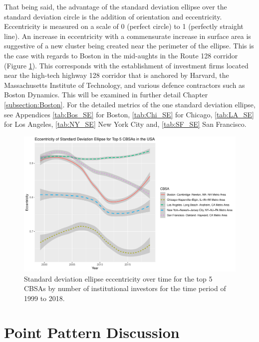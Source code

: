 That being said, the advantage of the standard deviation ellipse over the standard deviation circle is the addition of orientation and eccentricity. Eccentricity is measured on a scale of 0 (perfect circle) to 1 (perfectly straight line).  An increase in eccentricity with a commensurate increase in surface area is suggestive of a new cluster being created near the perimeter of the ellipse. This is the case with regards to Boston in the mid-aughts in the Route 128 corridor (Figure \ref{fig:Standard_Deviation_ellipse_Eccentricity}). This corresponds with the establishment of investment firms located near the high-tech highway 128 corridor that is anchored by Harvard, the Massachusetts Institute of Technology, and various defence contractors such as Boston Dynamics.  This will be examined in further detail Chapter \ref{subsection:Boston}.  For the detailed metrics of the one standard deviation ellipse, see Appendices \ref{tab:Bos_SE} for Boston, \ref{tab:Chi_SE} for Chicago, \ref{tab:LA_SE} for Los Angeles, \ref{tab:NY_SE} New York City and, \ref{tab:SF_SE} San Francisco. 


\begin{figure}[h]
	\centering
	\includegraphics[width=1\linewidth]{Figures/ChapterIII/Standard_Deviation_ellipse_Eccentricity}
	\caption[Standard Deviation Ellipse Eccentricity]{Standard deviation ellipse eccentricity over time for the top 5 CBSAs by number of institutional investors for the time period of 1999 to 2018.}
	\label{fig:Standard_Deviation_ellipse_Eccentricity}
\end{figure}

\section{Point Pattern Discussion} 

